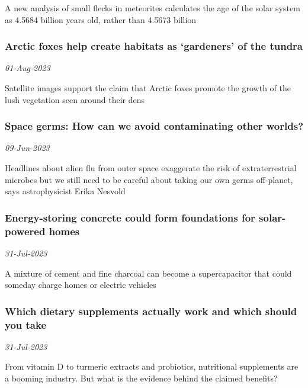 A new analysis of small flecks in meteorites calculates the age of the solar system as 4.5684 billion years old, rather than 4.5673 billion
\subsubsection{Arctic foxes help create habitats as ‘gardeners’ of the tundra \href{https://www.newscientist.com/article/2385227-arctic-foxes-help-create-habitats-as-gardeners-of-the-tundra/?utm_campaign=RSS%7CNSNS&utm_source=NSNS&utm_medium=RSS&utm_content=home}{\ding{225}}}
\textit{01-Aug-2023}

Satellite images support the claim that Arctic foxes promote the growth of the lush vegetation seen around their dens
\subsubsection{Space germs: How can we avoid contaminating other worlds? \href{https://www.newscientist.com/article/2375987-space-germs-how-can-we-avoid-contaminating-other-worlds/?utm_campaign=RSS%7CNSNS&utm_source=NSNS&utm_medium=RSS&utm_content=home}{}}
\textit{09-Jun-2023}

Headlines about alien flu from outer space exaggerate the risk of extraterrestrial microbes but we still need to be careful about taking our own germs off-planet, says astrophysicist Erika Nesvold
\subsubsection{Energy-storing concrete could form foundations for solar-powered homes \href{https://www.newscientist.com/article/2385500-energy-storing-concrete-could-form-foundations-for-solar-powered-homes/?utm_campaign=RSS%7CNSNS&utm_source=NSNS&utm_medium=RSS&utm_content=home}{\ding{225}}}
\textit{31-Jul-2023}

A mixture of cement and fine charcoal can become a supercapacitor that could someday charge homes or electric vehicles
\subsubsection{Which dietary supplements actually work and which should you take \href{https://www.newscientist.com/article/mg25934500-200-which-dietary-supplements-actually-work-and-which-should-you-take/?utm_campaign=RSS%7CNSNS&utm_source=NSNS&utm_medium=RSS&utm_content=home}{}}
\textit{31-Jul-2023}

From vitamin D to turmeric extracts and probiotics, nutritional supplements are a booming industry. But what is the evidence behind the claimed benefits?
